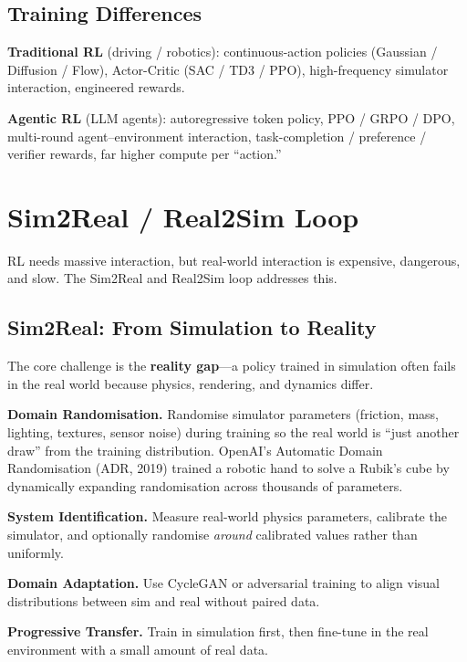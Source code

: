 \subsection{Training Differences}

\textbf{Traditional RL} (driving / robotics): continuous-action policies (Gaussian / Diffusion / Flow), Actor-Critic (SAC / TD3 / PPO), high-frequency simulator interaction, engineered rewards.

\textbf{Agentic RL} (LLM agents): autoregressive token policy, PPO / GRPO / DPO, multi-round agent--environment interaction, task-completion / preference / verifier rewards, far higher compute per ``action.''

\section{Sim2Real / Real2Sim Loop}
\label{sec:sim2real}

RL needs massive interaction, but real-world interaction is expensive, dangerous, and slow.
The Sim2Real and Real2Sim loop addresses this.

\subsection{Sim2Real: From Simulation to Reality}

The core challenge is the \textbf{reality gap}---a policy trained in simulation often fails in the real world because physics, rendering, and dynamics differ.

\textbf{Domain Randomisation.}
Randomise simulator parameters (friction, mass, lighting, textures, sensor noise) during training so the real world is ``just another draw'' from the training distribution.
OpenAI's Automatic Domain Randomisation (ADR, 2019) trained a robotic hand to solve a Rubik's cube by dynamically expanding randomisation across thousands of parameters.

\textbf{System Identification.}
Measure real-world physics parameters, calibrate the simulator, and optionally randomise \emph{around} calibrated values rather than uniformly.

\textbf{Domain Adaptation.}
Use CycleGAN or adversarial training to align visual distributions between sim and real without paired data.

\textbf{Progressive Transfer.}
Train in simulation first, then fine-tune in the real environment with a small amount of real data.

